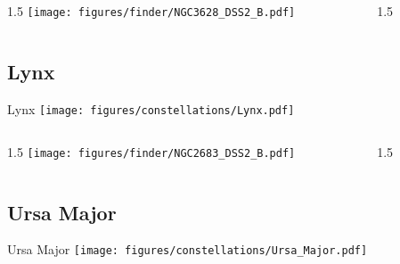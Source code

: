 \documentclass[final]{beamer}
\newlength{\colwidth}
\begin{document}

\begin{frame}[t]{}
  \begin{columns}[T]
    \begin{column}{1.5\colwidth}
      \centering
      \texttt{[image: figures/finder/NGC3628\_DSS2\_B.pdf]}
    \end{column}
    \begin{column}{1.5\colwidth}
      \Large
      
    \end{column}
  \end{columns}
  \vspace{\fill}
\end{frame}

\subsection{Lynx}

\begin{frame}[t]{\LARGE Lynx}
  \centering
  \texttt{[image: figures/constellations/Lynx.pdf]}
\end{frame}


\begin{frame}[t]{}
  \begin{columns}[T]
    \begin{column}{1.5\colwidth}
      \centering
      \texttt{[image: figures/finder/NGC2683\_DSS2\_B.pdf]}
    \end{column}
    \begin{column}{1.5\colwidth}
      \Large
      
    \end{column}
  \end{columns}
  \vspace{\fill}
\end{frame}

\subsection{Ursa Major}

\begin{frame}[t]{\LARGE Ursa Major}
  \centering
  \texttt{[image: figures/constellations/Ursa\_Major.pdf]}
\end{frame}
\end{document}
